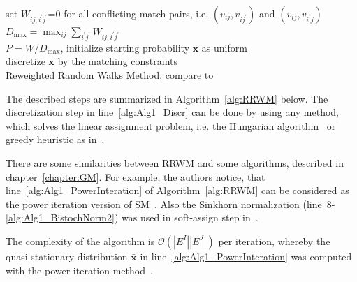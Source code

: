 \begin{algorithm}[t] 
	set $W_{ij,i^\prime j^\prime}$=0 for all conflicting match pairs, i.e. $(v_{ij},v_{ij^\prime})$ and $(v_{ij},v_{i^\prime j})$ \\
	$D_{\text{max}}=\max_{ij}\sum_{i^\prime j^\prime}W_{ij,i^\prime j^\prime}$ \\
	$P=W/D_{\text{max}}$, initialize starting probability $\mathbf{x}$ as uniform\\
	discretize $\mathbf{x}$ by the matching constraints \label{alg:Alg1_Discr} \\
	\caption{Reweighted Random Walks Method, compare to~\cite{Cho2010_RRWM}}    
	\label{alg:RRWM}
\end{algorithm}

The described steps are summarized in Algorithm~\ref{alg:RRWM} below. The discretization step in line~\ref{alg:Alg1_Discr} can be done by using any method, which solves the linear assignment problem, i.e. the Hungarian algorithm~\cite{Kuhn1955} or greedy heuristic as in~\cite{Leordeanu2005_SM}.

There are some similarities between RRWM and some algorithms, described in chapter~\ref{chapter:GM}. For example, the authors notice, that line~\ref{alg:Alg1_PowerInteration} of Algorithm~\ref{alg:RRWM} can be considered as the power iteration version of SM~\cite{Leordeanu2005_SM}. Also the Sinkhorn normalization (line~8-\ref{alg:Alg1_BistochNorm2}) was used in soft-assign step in~\cite{Rangarajan1996_GAGM}. 


The complexity of the algorithm is $\mathcal{O}(|E^I||E^J|)$ per iteration, whereby the quasi-stationary distribution $\mathbf{\bar{x}}$ in line~\ref{alg:Alg1_PowerInteration} was computed with the power iteration method~\cite{PowerIteration}.

